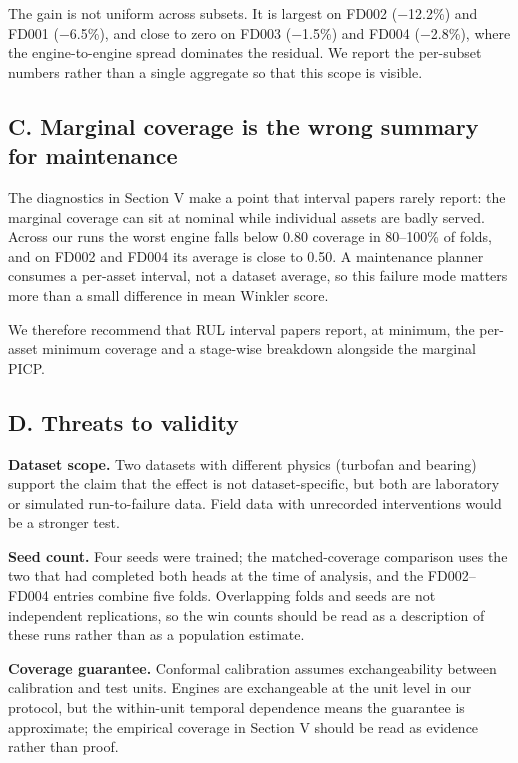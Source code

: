 ﻿\documentclass[journal]{IEEEtran}
\begin{document}
The gain is not uniform across subsets. It is largest on FD002 (−12.2\%) and FD001 (−6.5\%), and close to zero on FD003 (−1.5\%) and FD004 (−2.8\%), where the engine-to-engine spread dominates the residual. We report the per-subset numbers rather than a single aggregate so that this scope is visible.

\subsection{C. Marginal coverage is the wrong summary for maintenance}\label{c.-marginal-coverage-is-the-wrong-summary-for-maintenance}

The diagnostics in Section V make a point that interval papers rarely report: the marginal coverage can sit at nominal while individual assets are badly served. Across our runs the worst engine falls below 0.80 coverage in 80--100\% of folds, and on FD002 and FD004 its average is close to 0.50. A maintenance planner consumes a per-asset interval, not a dataset average, so this failure mode matters more than a small difference in mean Winkler score.

We therefore recommend that RUL interval papers report, at minimum, the per-asset minimum coverage and a stage-wise breakdown alongside the marginal PICP.

\subsection{D. Threats to validity}\label{d.-threats-to-validity}

\textbf{Dataset scope.} Two datasets with different physics (turbofan and bearing) support the claim that the effect is not dataset-specific, but both are laboratory or simulated run-to-failure data. Field data with unrecorded interventions would be a stronger test.

\textbf{Seed count.} Four seeds were trained; the matched-coverage comparison uses the two that had completed both heads at the time of analysis, and the FD002--FD004 entries combine five folds. Overlapping folds and seeds are not independent replications, so the win counts should be read as a description of these runs rather than as a population estimate.

\textbf{Coverage guarantee.} Conformal calibration assumes exchangeability between calibration and test units. Engines are exchangeable at the unit level in our protocol, but the within-unit temporal dependence means the guarantee is approximate; the empirical coverage in Section V should be read as evidence rather than proof.
\end{document}
